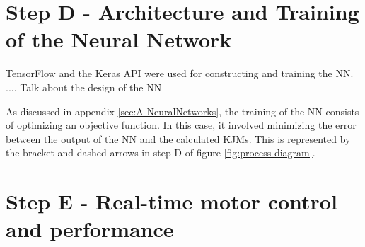 \documentclass[../main.tex]{subfiles}
\begin{document}
\section{Step D - Architecture and Training of the Neural Network}
TensorFlow \cite{tensorflow2015-whitepaper} and the Keras API \cite{chollet2015keras} were used for constructing and training the \ac{NN}.
.... Talk about the design of the \ac{NN}

As discussed in appendix \ref{sec:A-NeuralNetworks}, the training of the \ac{NN} consists of optimizing an objective function.
In this case, it involved minimizing the error between the output of the \ac{NN} and the calculated \acp{KJM}.
This is represented by the bracket and dashed arrows in step D of figure \ref{fig:process-diagram}.




\section{Step E - Real-time motor control and performance}
\end{document}

